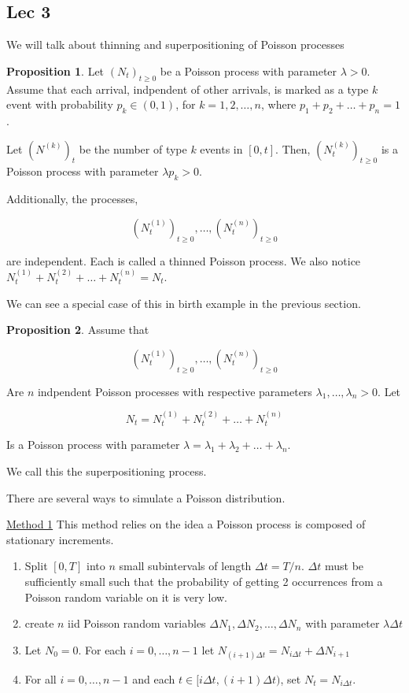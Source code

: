 \documentclass[12pt]{article}
\theoremstyle{definition}
\newtheorem{proposition}{Proposition}[section]
\begin{document}
  \subsection{Lec 3}

  We will talk about thinning and superpositioning of Poisson processes

  \begin{proposition}
    Let $(N_t)_{t \geq 0}$ be a Poisson process with parameter $\lambda > 0$. Assume that each arrival, indpendent of other arrivals, is marked as a type $k$ event with probability $p_k \in (0,1)$, for $k = 1, 2, \dots, n$, where $p_1 + p_2 + \dots + p_n =1$.

    Let $(N^{(k)})_t$ be the number of type $k$ events in $[0,t]$. Then, $(N^{(k)}_t)_{t \geq 0}$ is a Poisson process with parameter $\lambda p_k > 0$.

    Additionally, the processes,

    $$
    (N^{(1)}_t)_{t \geq 0}, \dots,  (N^{(n)}_t)_{t \geq 0}
    $$

    are independent. Each is called a thinned Poisson process. We also notice $N^{(1)}_t + N^{(2)}_t + \dots + N^{(n)}_t  =  N_t$.
  \end{proposition}

  We can see a special case of this in birth example in the previous section.

  \begin{proposition}
    Assume that

    $$
(N^{(1)}_t)_{t \geq 0}, \dots,  (N^{(n)}_t)_{t \geq 0}
    $$

    Are $n$ indpendent Poisson processes with respective parameters $\lambda_1, \dots, \lambda_n > 0$. Let

    $$
    N_t = N^{(1)}_t + N^{(2)}_t + \dots + N^{(n)}_t
    $$

    Is a Poisson process with parameter $\lambda = \lambda_1 + \lambda_2 + \dots + \lambda_n$.

    We call this the superpositioning process.
  \end{proposition}

  There are several ways to simulate a Poisson distribution.

  \underline{Method 1}
  This method relies on the idea a Poisson process is composed of stationary increments.
  \begin{enumerate}
    \item Split $[0,T]$ into $n$ small subintervals of length $\Delta t = T/n$. $\Delta t$ must be sufficiently small such that the probability of getting 2 occurrences from a Poisson random variable on it is very low.
    \item create $n$ iid Poisson random variables $\Delta N_1, \Delta N_2, \dots, \Delta N_n$ with parameter $\lambda \Delta t$
    \item Let $N_0 = 0$. For each $i = 0, \dots, n-1$ let $N_{(i +1)\Delta t} = N_{i \Delta t} +\Delta  N_{i +1}$
    \item For all $i = 0, \dots, n-1$ and each $t \in [i \Delta t, (i+1) \Delta t)$, set $N_t = N_{i \Delta t}$.
  \end{enumerate}
\end{document}
